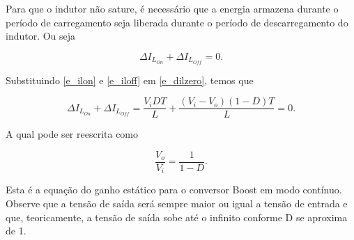     Para que o indutor não sature, é necessário que a energia armazena durante o período de carregamento seja liberada durante o período de descarregamento do indutor. Ou seja

    
    \begin{equation}
        \Delta I_{L_{On}} + \Delta I_{L_{Off}}=0.
        \label{e_dilzero}
    \end{equation}
    
    
    Substituindo \ref{e_ilon} e \ref{e_iloff} em \ref{e_dilzero}, temos que
    
    \[
        \Delta I_{L_{On}} + \Delta I_{L_{Off}}=\frac{V_i D T}{L}+\frac{\left(V_i-V_o\right)\left(1-D\right)T}{L}=0.
    \]

    A qual pode ser reescrita como
    
    \begin{equation}
        \frac{V_o}{V_i}=\frac{1}{1-D}.
        \label{e_ganho}
    \end{equation}
    
    Esta é a equação do ganho estático para o conversor Boost em modo contínuo. Observe que a tensão de saída será sempre maior ou igual a tensão de entrada e que, teoricamente, a tensão de saída sobe até o infinito conforme D se aproxima de 1.